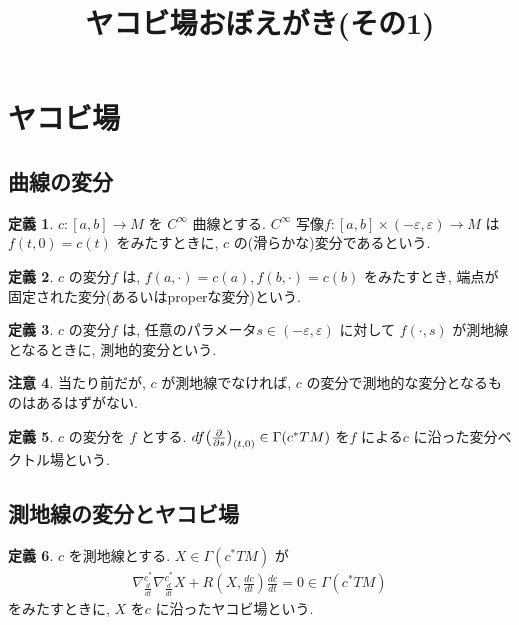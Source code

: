 \documentclass[twocolumn, landscape, a4paper , 8pt, fleqn, titlepage ]{jsarticle}
\title{ヤコビ場おぼえがき(その1)}
\author{}
\date{}
\theoremstyle{definition}
\newtheorem{dfn}{定義}[section]
\newtheorem{remark}[dfn]{注意}
\newcommand{\veps}{\varepsilon}
\newcommand{\paren}[1]{\mleft( #1\mright )}
\renewcommand{\-}{\hyphen}
\begin{document}
\maketitle

\scriptsize 


\section{ヤコビ場}
\subsection{曲線の変分}

\begin{dfn}
$c:[a,b]\rightarrow M$ を $C^\infty$ 曲線とする. $C^\infty$ 写像$f:[a,b]\times (-\veps, \veps) \rightarrow M$ は \\
$f(t,0) = c(t)$ をみたすときに, $c$ の(滑らかな)変分であるという.
\end{dfn}

\begin{dfn}
$c$ の変分$f$ は, $f(a, \cdot ) = c(a), f(b, \cdot) = c(b)$ をみたすとき, 端点が固定された変分(あるいはproperな変分)という.
\end{dfn}

\begin{dfn}
$c$ の変分$f$ は, 任意のパラメータ$s\in (-\veps, \veps)$ に対して $f(\cdot, s)$ が測地線となるときに, 測地的変分という.
\end{dfn}

\begin{remark}
当たり前だが, $c$ が測地線でなければ, $c$ の変分で測地的な変分となるものはあるはずがない.
\end{remark}

\begin{dfn}
$c$ の変分を $f$ とする. $df\paren{\frac{\partial}{\partial s} }_{(t,0)} \in \Gamma(c^* TM)$ を$f$ による$c$ に沿った変分ベクトル場という.
\end{dfn}

\subsection{測地線の変分とヤコビ場}

\begin{dfn}
$c$ を測地線とする. $X \in \Gamma(c^* TM)$ が
\begin{align*}
\nabla_{\frac{d}{dt} }^{c^*} \nabla_{\frac{d}{dt} }^{c^*} X + R(X, \frac{dc}{dt} ) \frac{dc}{dt} = 0 \in \Gamma(c^* TM)
\end{align*}
をみたすときに, $X$ を$c$ に沿ったヤコビ場という.
\end{dfn}
\end{document}
